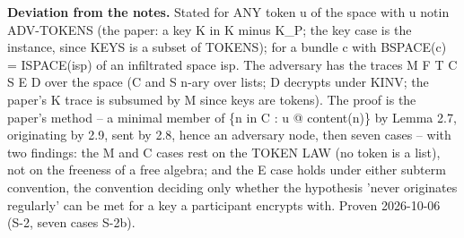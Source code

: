 \noindent\textbf{Deviation from the notes.} Stated for ANY token u of the space with u notin ADV-TOKENS (the paper: a key K in K minus K\_P; the key case is the instance, since KEYS is a subset of TOKENS); for a bundle c with BSPACE(c) = ISPACE(isp) of an infiltrated space isp. The adversary has the traces M F T C S E D over the space (C and S n-ary over lists; D decrypts under KINV; the paper's K trace is subsumed by M since keys are tokens). The proof is the paper's method -- a minimal member of \{n in C : u @ content(n)\} by Lemma 2.7, originating by 2.9, sent by 2.8, hence an adversary node, then seven cases -- with two findings: the M and C cases rest on the TOKEN LAW (no token is a list), not on the freeness of a free algebra; and the E case holds under either subterm convention, the convention deciding only whether the hypothesis 'never originates regularly' can be met for a key a participant encrypts with. Proven 2026-10-06 (S-2, seven cases S-2b).
%
\renewcommand{\thethm}{5.2}
